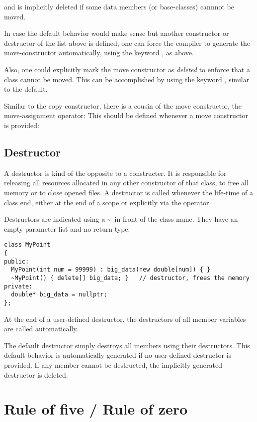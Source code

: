 and is implicitly deleted if some data members (or base-classes) cannnot be moved.

In case the default behavior would make sense but another constructor or destructor of the list above is defined, one can force the compiler to generate
the move-constructor automatically, using the keyword , as above.

Also, one could explicitly mark the move constructor as \emph{deleted} to enforce that a class cannot be moved. This can be accomplished by using the
keyword , similar to the default.

Similar to the copy constructor, there is a cousin of the move constructor, the move-assignment operator: This should be defined whenever a move constructor
is provided:


\subsection{Destructor\label{sec:destructor}}
A destructor is kind of the opposite to a constructer. It is responsible for releasing all resources allocated in any other constructor of that class, \eg
to free all memory or to close opened files. A destructor is called whenever the life-time of a class end, either at the end of a scope or explicitly via
the  operator.

Destructors are indicated using a \textasciitilde\ in front of the class name. They have an empty parameter list and no return type:
%
\begin{verbatim}
class MyPoint
{
public:
  MyPoint(int num = 99999) : big_data(new double[num]) { }
  ~MyPoint() { delete[] big_data; }   // destructor, frees the memory
private:
  double* big_data = nullptr;
};
\end{verbatim}
At the end of a user-defined destructor, the destructors of all member variables are called automatically.

The default destructor simply destroys all members using their destructors. This default behavior is automatically generated if
no user-defined destructor is provided. If any member cannot be destructed, the implicitly generated destructor is deleted.

\section{Rule of five / Rule of zero}

